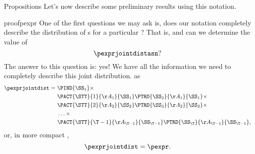 \begin{part}{Propositions}
  Let's now describe some preliminary results using this notation.

  \begin{refenv}{proof}{pexpr}
    One of the first questions we may ask is, does our notation completely describe
    the distribution of \run{}s for a particular \str?
    That is, 
    and
    can we determine the value of
    $$\pexprjointdistasn?$$
    The answer to this question is: yes! 
    We have all the information we need 
    to completely describe 
    this joint distribution. 
     as
    \begin{align*}
      \pexprjointdist
      =\ &\PIND{\SS_1}\times\\
         &\PACT{\STT}{1}{\AA_1}{\SS_1}
          \PTRD{\SS_2}{\AA_1}{\SS_1}\times\\
         &\PACT{\STT}{2}{\AA_2}{\SS_2}
          \PTRD{\SS_3}{\AA_2}{\SS_2}\times\\
         &\ldots\times\\
         &\PACT{\STT}{{\T - 1}}{\AA_{\T - 1}}{\SS_{\T - 1}}
          \PTRD{\SS_\T}{\AA_{\T - 1}}{\SS_{\T - 1}},
    \end{align*}
    or, in more compact ,
    $$\pexprjointdist = \pexpr.$$
  \end{refenv}
\end{part}
